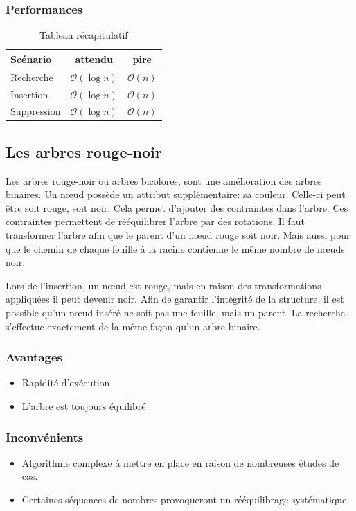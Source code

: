 \documentclass[hidelinks,a4paper, 12pt]{article}
\begin{document}
	\subsubsection*{Performances}
	\begin{table}[h]
		\begin{tabular}{|l|c|c|}
			\hline
			Scénario & attendu & pire \\
			\hline
			Recherche & $\mathcal{O}(\log n)$ & $\mathcal{O}(n)$ \\ 
			\hline
			Insertion & $\mathcal{O}(\log n)$ & $\mathcal{O}(n)$ \\
			\hline
			Suppression & $\mathcal{O}(\log n)$ & $\mathcal{O}(n)$\\
			\hline
		\end{tabular}
		\caption{Tableau récapitulatif}
	\end{table}
	
	\subsection{Les arbres rouge-noir}
	Les arbres rouge-noir ou arbres bicolores, sont une amélioration des arbres binaires. Un nœud possède un attribut supplémentaire: sa couleur. Celle-ci peut être soit rouge, soit noir. Cela permet d'ajouter des contraintes dans l'arbre. Ces contraintes permettent de rééquilibrer l'arbre par des rotations. Il faut transformer l'arbre afin que le parent d'un nœud rouge soit noir. Mais aussi pour que le chemin de chaque feuille à la racine contienne le même nombre de nœuds noir.
	
	Lors de l'insertion, un nœud est rouge, mais en raison des transformations appliquées il peut devenir noir. Afin de garantir l'intégrité de la structure, il est possible qu'un nœud inséré ne soit pas une feuille, mais un parent. La recherche s'effectue exactement de la même façon qu'un arbre binaire.
	
	
	
	\subsubsection*{Avantages}
	\begin{itemize}
		\item Rapidité d'exécution
		\item L'arbre est toujours équilibré
	\end{itemize}
	\subsubsection*{Inconvénients}
	\begin{itemize}
		\item Algorithme complexe à mettre en place en raison de nombreuses études de cas.
		\item Certaines séquences de nombres provoqueront un rééquilibrage systématique.
	\end{itemize}
\end{document}
